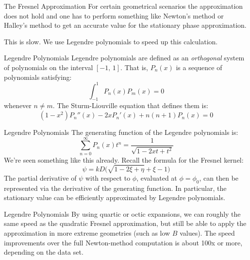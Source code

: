 \documentclass{beamer}
\begin{document}
    \begin{frame}{The Fresnel Approximation}
        For certain geometrical scenarios the approximation does not hold and
        one has to perform something like Newton's method or Halley's method
        to get an accurate value for the stationary phase approximation.
        \par\hfill\par
        This is slow. We use Legendre polynomials to speed up this calculation.
    \end{frame}
    \begin{frame}{Legendre Polynomials}
        Legendre polynomials are defined as an \textit{orthogonal} system of
        polynomials on the interval $[-1,\,1]$. That is, $P_{n}(x)$ is a
        sequence of polynomials satisfying:
        \begin{equation}
            \int_{-1}^{1}P_{n}(x)P_{m}(x)=0
        \end{equation}
        whenever $n\ne{m}$. The Sturm-Liouville equation that defines them is:
        \begin{equation}
            (1-x^{2})P_{n}''(x)-2xP_{n}'(x)+n(n+1)P_{n}(x)=0
        \end{equation}
    \end{frame}
    \begin{frame}{Legendre Polynomials}
        The generating function of the Legendre polynomials is:
        \begin{equation}
            \sum_{n=0}^{\infty}P_{n}(x)t^{n}
                =\frac{1}{\sqrt{1-2xt+t^{2}}}
        \end{equation}
        We're seen something like this already. Recall the formula for the
        Fresnel kernel:
        \begin{equation}
            \psi=kD\Big(\sqrt{1-2\xi+\eta}+\xi-1\Big)
        \end{equation}
        The partial derivative of $\psi$ with respect to $\phi$, evaluated at
        $\phi=\phi_{0}$, can then be represented via the derivative of the
        generating function. In particular, the stationary value can be
        efficiently approximated by Legendre polynomials.
    \end{frame}
    \begin{frame}{Legendre Polynomials}
        By using quartic or octic expansions, we can roughly the same speed as
        the quadratic Fresnel approximation, but still be able to apply the
        approximation in more extreme geometries (such as low $B$ values).
        The speed improvements over the full Newton-method computation is about
        100x or more, depending on the data set.
    \end{frame}
\end{document}
